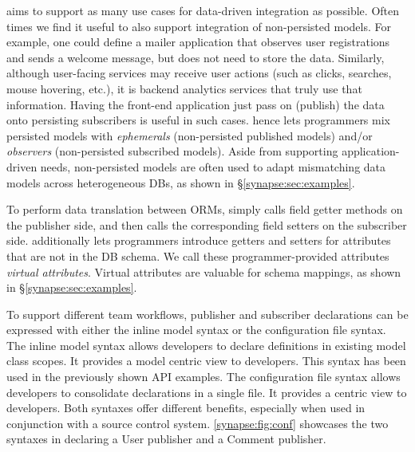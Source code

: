  \synapse aims to support as many use cases
for data-driven integration as possible.  Often times we find it useful to
also support integration of non-persisted models.
For example, one could define a mailer application that observes user
registrations and sends a welcome message, but does not need to store the data.
Similarly, although user-facing services may receive user actions
(such as clicks, searches, mouse hovering, etc.), it is backend analytics
services that truly use that information.  Having the front-end application just
pass on (publish) the data onto persisting subscribers is useful in such cases.
\synapse hence lets programmers mix persisted models with {\em ephemerals}
(non-persisted published models)
and/or {\em observers} (non-persisted subscribed models).  Aside from
supporting application-driven needs, non-persisted models are often used to
adapt mismatching data models across heterogeneous DBs, as shown in
\S\ref{synapse:sec:examples}.

 To perform data translation between ORMs,
\synapse simply calls field getter methods on the publisher side, and then
calls the corresponding field setters on the subscriber side. \synapse
additionally lets programmers introduce getters and setters for attributes
that are not in the DB schema.  We call these programmer-provided attributes
{\em virtual attributes}. Virtual attributes are valuable for schema mappings,
as shown in \S\ref{synapse:sec:examples}.

To support different team workflows, publisher and subscriber declarations can
be expressed with either the inline model syntax or the configuration file syntax.
The inline model syntax allows developers to declare definitions in existing model class scopes.
It provides a model centric view to developers.
This syntax has been used in the previously shown API examples.
The configuration file syntax allows developers to consolidate \synapse
declarations in a single file. It provides a \synapse centric view to developers.
Both syntaxes offer different benefits, especially when used in conjunction with a source
control system.
\F\ref{synapse:fig:conf} showcases the two syntaxes in declaring a User publisher and a
Comment publisher.

